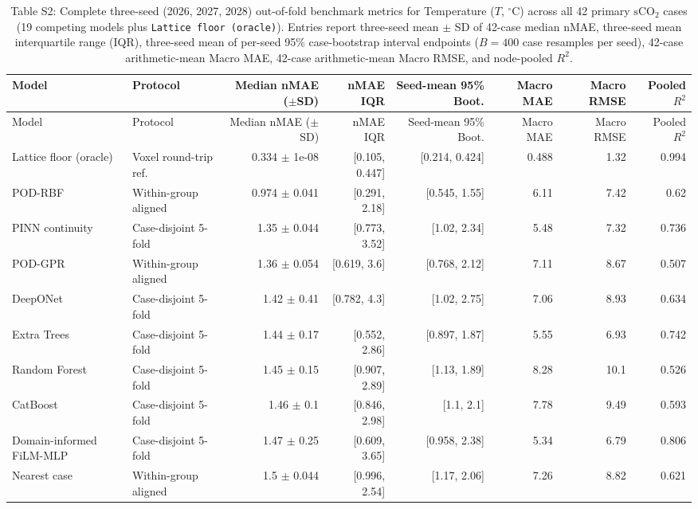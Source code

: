 \begin{landscape}\scriptsize
\begin{longtable}{p{3.8cm}p{2.9cm}rrrrrr}
\caption{Table S2: Complete three-seed (2026, 2027, 2028) out-of-fold benchmark metrics for Temperature ($T$, $^\circ$C) across all 42 primary $\mathrm{sCO}_2$ cases (19 competing models plus \texttt{Lattice floor (oracle)}). Entries report three-seed mean $\pm$ SD of 42-case median nMAE, three-seed mean interquartile range (IQR), three-seed mean of per-seed 95\% case-bootstrap interval endpoints ($B=400$ case resamples per seed), 42-case arithmetic-mean Macro MAE, 42-case arithmetic-mean Macro RMSE, and node-pooled $R^2$.}\\
\toprule Model & Protocol & Median nMAE ($\pm$SD) & nMAE IQR & Seed-mean 95\% Boot. & Macro MAE & Macro RMSE & Pooled $R^2$\\
\midrule\endfirsthead
\toprule Model & Protocol & Median nMAE ($\pm$SD) & nMAE IQR & Seed-mean 95\% Boot. & Macro MAE & Macro RMSE & Pooled $R^2$\\
\midrule\endhead
Lattice floor (oracle) & Voxel round-trip ref. & 0.334 $\pm$ 1e-08 & [0.105, 0.447] & [0.214, 0.424] & 0.488 & 1.32 & 0.994 \\
POD-RBF & Within-group aligned & 0.974 $\pm$ 0.041 & [0.291, 2.18] & [0.545, 1.55] & 6.11 & 7.42 & 0.62 \\
PINN continuity & Case-disjoint 5-fold & 1.35 $\pm$ 0.044 & [0.773, 3.52] & [1.02, 2.34] & 5.48 & 7.32 & 0.736 \\
POD-GPR & Within-group aligned & 1.36 $\pm$ 0.054 & [0.619, 3.6] & [0.768, 2.12] & 7.11 & 8.67 & 0.507 \\
DeepONet & Case-disjoint 5-fold & 1.42 $\pm$ 0.41 & [0.782, 4.3] & [1.02, 2.75] & 7.06 & 8.93 & 0.634 \\
Extra Trees & Case-disjoint 5-fold & 1.44 $\pm$ 0.17 & [0.552, 2.86] & [0.897, 1.87] & 5.55 & 6.93 & 0.742 \\
Random Forest & Case-disjoint 5-fold & 1.45 $\pm$ 0.15 & [0.907, 2.89] & [1.13, 1.89] & 8.28 & 10.1 & 0.526 \\
CatBoost & Case-disjoint 5-fold & 1.46 $\pm$ 0.1 & [0.846, 2.98] & [1.1, 2.1] & 7.78 & 9.49 & 0.593 \\
Domain-informed FiLM-MLP & Case-disjoint 5-fold & 1.47 $\pm$ 0.25 & [0.609, 3.65] & [0.958, 2.38] & 5.34 & 6.79 & 0.806 \\
Nearest case & Within-group aligned & 1.5 $\pm$ 0.044 & [0.996, 2.54] & [1.17, 2.06] & 7.26 & 8.82 & 0.621 \\

\end{longtable}
\end{landscape}
